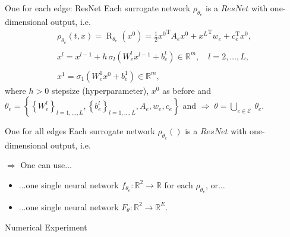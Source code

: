 \documentclass[9pt]{beamer}
\begin{document}
\begin{frame}{One for each edge: ResNet}
    Each surrogate network $\rho_{\theta_e}$ is a $ResNet$ with one-dimensional output, i.e.  
    \begin{equation*} 
        \label{Resnet1}
        \begin{gathered}
            \rho_{\theta_e} \left(t, x \right) = \operatorname{R}_{\theta_e}\left(x^0\right) = \frac{1}{2} {x^0}^{\mathrm{T}} A_e x^0 + {x^{L}}^{\mathrm{T}} w_e + c^{\mathrm{T}}_e x^0, \\
            \\
            x^l = x^{l-1} + h \, \sigma_l\left(W^l_e x^{l-1} + b^l_e\right) \in \mathbb{R}^m, \quad l = 2, \ldots, L, \\
            \\
            x^1 = \sigma_1\left(W^1_e x^{0} + b^1_e\right) \in \mathbb{R}^m,
        \end{gathered} 
    \end{equation*}
    where $h > 0$ stepsize (hyperparameter), $x^0$ as before and \\
    $\theta_e = \left\{ \left\{ W^l_e \right\}_{l = 1, \ldots, L}, \left\{ b^l_e \right\}_{l = 1, \ldots, L}, A_e, w_e, c_e \right\}$ and 
    \vspace{3mm}
    $\Rightarrow \; \theta = \bigcup_{e \in \mathcal{E}} \ \theta_e$.
\end{frame}




\begin{frame}{One for all edges}
    Each surrogate network $\rho_{\theta_e}()$ is a $ResNet$ with one-dimensional output, i.e.  
    
    \vspace{3mm}

    $\Rightarrow$ One can use$\ldots$
    \begin{itemize}
        \item $\ldots$one single neural network $f_{\theta_e} \colon \mathbb{R}^2 \to \mathbb{R}$ for each $\rho_{\theta_e}$, or$\ldots$
        \item $\ldots$one single neural network $F_{\theta} \colon \mathbb{R}^2 \to \mathbb{R}^E$.
    \end{itemize}
\end{frame}


\begin{frame}{Numerical Experiment}
    
\end{frame}
\end{document}
